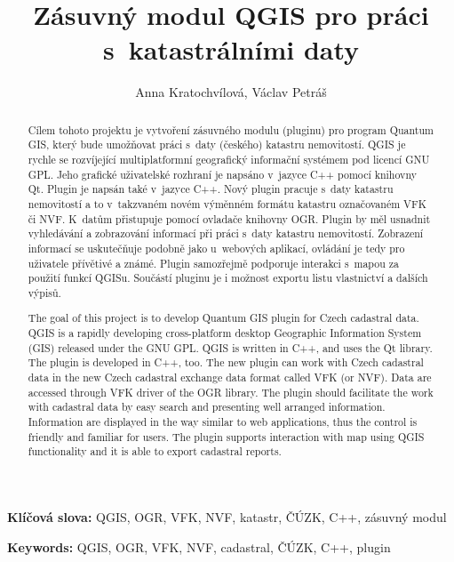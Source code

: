 \documentclass[a4paper,10pt]{article}
\title{Zásuvný modul QGIS pro práci s~katastrálními daty}
\author{Anna Kratochvílová, Václav Petráš}
\newcommand{\klicslova}[2]{\noindent\textbf{#1: }#2}
\begin{document}
\pagestyle{empty}

\newpage
\begin{abstract}
Cílem tohoto projektu je vytvoření zásuvného modulu (pluginu) pro program Quantum GIS,
který bude umožňovat práci s~daty (českého) katastru nemovitostí.
QGIS je rychle se rozvíjející  multiplatformní geografický informační systémem pod licencí GNU GPL.
Jeho grafické uživatelské rozhraní je napsáno v~jazyce C++ pomocí knihovny Qt. Plugin je napsán také v~jazyce C++.
Nový plugin pracuje s~daty katastru nemovitostí a to v~takzvaném novém výměnném formátu katastru označovaném VFK či NVF.
K~datům přistupuje pomocí ovladače knihovny OGR. Plugin by měl usnadnit vyhledávání a zobrazování
informací při práci s~daty katastru nemovitostí.
Zobrazení informací se uskutečňuje podobně jako u~webových aplikací, ovládání je tedy pro uživatele přívětivé a známé.
Plugin samozřejmě podporuje interakci s~mapou za použití funkcí QGISu.
Součástí pluginu je i možnost exportu listu vlastnictví a dalších výpisů.
\end{abstract}

\bigskip

\klicslova{Klíčová slova}{QGIS, OGR, VFK, NVF, katastr, ČÚZK, C++, zásuvný modul}
\begin{abstract}
The goal of this project is to develop Quantum GIS plugin for Czech cadastral data.
QGIS is a rapidly developing cross-platform desktop Geographic Information System (GIS) released under the GNU GPL.
QGIS is written in C++, and uses the Qt library.
The plugin is developed in C++, too.
The new plugin can work with Czech cadastral data in the new Czech cadastral exchange data format called VFK (or NVF).
Data are accessed through VFK driver of the OGR library.
The plugin should facilitate the work with cadastral data by easy search and presenting well arranged information.
Information are displayed in the way similar to web applications, thus the control is friendly and familiar for users.
The plugin supports interaction with map using QGIS functionality and it is able to export cadastral reports.
\end{abstract}

\bigskip

\klicslova{Keywords}{QGIS, OGR, VFK, NVF, cadastral, ČÚZK, C++, plugin}
\newpage


\tableofcontents
\newpage
\end{document}
